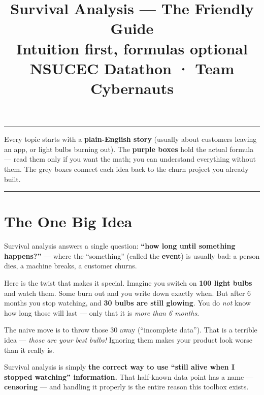 \documentclass[11pt]{article}
\title{\vspace{-1.5cm}\textbf{Survival Analysis --- The Friendly Guide}\\[3pt]
\large Intuition first, formulas optional \\[2pt]
\normalsize NSUCEC Datathon · Team Cybernauts}
\author{}
\date{}
\begin{document}
\maketitle
\vspace{-1.0cm}
\hrule
\vspace{6pt}

\begin{plainbox}
Every topic starts with a \textbf{plain-English story} (usually about customers leaving an app, or
light bulbs burning out). The \textbf{\textcolor{mathc}{purple boxes}} hold the actual formula --- read
them only if you want the math; you can understand everything without them. The grey boxes connect
each idea back to the churn project you already built.
\end{plainbox}

\tableofcontents
\vspace{6pt}
\hrule

\section{The One Big Idea}

Survival analysis answers a single question: \textbf{``how long until something happens?''} --- where
the ``something'' (called the \textbf{event}) is usually bad: a person dies, a machine breaks, a
customer churns.

Here is the twist that makes it special. Imagine you switch on \textbf{100 light bulbs} and watch
them. Some burn out and you write down exactly when. But after 6 months you stop watching, and
\textbf{30 bulbs are still glowing}. You do \emph{not} know how long those will last --- only that
it is \emph{more than 6 months}.

The naive move is to throw those 30 away (``incomplete data''). That is a terrible idea ---
\emph{those are your best bulbs!} Ignoring them makes your product look worse than it really is.

\begin{plainbox}
Survival analysis is simply \textbf{the correct way to use ``still alive when I stopped watching''
information.} That half-known data point has a name --- \textbf{censoring} --- and handling it
properly is the entire reason this toolbox exists.
\end{plainbox}
\end{document}
